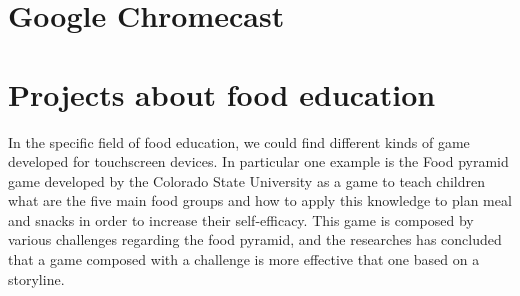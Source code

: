 \section{Google Chromecast}
\section{Projects about food education}
In the specific field of food education, we could find different kinds of game developed for touchscreen devices. In particular one example is the Food pyramid game developed by the Colorado State University \cite{Serrano} as a game to teach children what are the five main food groups and how to apply this knowledge to plan meal and snacks in order to increase their self-efficacy. This game is composed by various challenges regarding the food pyramid, and the researches has concluded that a game composed with a challenge is more effective that one based on a storyline.

